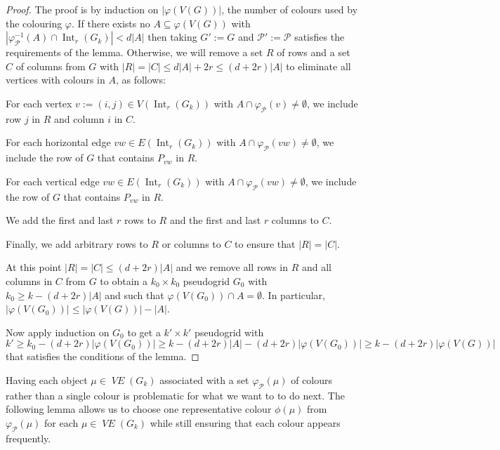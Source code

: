 \documentclass{patmorin}
\DeclareMathOperator{\interior}{Int}
\DeclareMathOperator{\VE}{\mathit{VE}}
\begin{document}
\begin{proof}
  The proof is by induction on $|\varphi(V(G))|$, the number of colours used by the colouring $\varphi$.  If there exists no $A\subseteq \varphi(V(G))$ with $|\varphi_{\mathcal{P}}^{-1}(A)\cap\interior_r(G_k)| < d|A|$ then taking $G':=G$ and $\mathcal{P}':=\mathcal{P}$ satisfies the requirements of the lemma.  Otherwise, we will remove a set $R$ of rows and a set $C$ of columns from $G$ with $|R|=|C|\le d|A|+2r \le (d+2r)|A|$ to eliminate all vertices with colours in $A$, as follows:
  \begin{compactitem}
    \item For each vertex $v:=(i,j)\in V(\interior_r(G_{k}))$ with $A\cap\varphi_\mathcal{P}(v)\neq\emptyset$, we include row $j$ in $R$ and column $i$ in $C$.
    \item For each horizontal edge $vw\in E(\interior_r(G_{k}))$ with $A\cap\varphi_\mathcal{P}(vw)\neq\emptyset$, we include the row of $G$ that contains $P_{vw}$ in $R$.
    \item For each vertical edge $vw\in E(\interior_r(G_{k}))$ with $A\cap\varphi_\mathcal{P}(vw)\neq\emptyset$, we include the row of $G$ that contains $P_{vw}$ in $R$.
    \item We add the first and last $r$ rows to $R$ and the first and last $r$ columns to $C$.
    \item Finally, we add arbitrary rows to $R$ or columns to $C$ to ensure that $|R|=|C|$.
  \end{compactitem}
  At this point $|R|=|C|\le (d+2r)|A|$ and we remove all rows in $R$ and all columns in $C$ from $G$ to obtain a $k_0\times k_0$ pseudogrid $G_0$ with $k_0\ge k-(d+2r)|A|$ and such that $\varphi(V(G_0))\cap A=\emptyset$.  In particular, $|\varphi(V(G_0))|\le |\varphi(V(G))|-|A|$.

  Now apply induction on $G_0$ to get a $k'\times k'$ pseudogrid with
  \[
    k'\ge k_0-(d+2r)|\varphi(V(G_0))|
      \ge k-(d+2r)|A|-(d+2r)|\varphi(V(G_0))|
      \ge k - (d+2r)|\varphi(V(G))|
  \]
  that satisfies the conditions of the lemma.
\end{proof}


Having each object $\mu\in\VE(G_k)$ associated with a set $\varphi_\mathcal{P}(\mu)$ of colours rather than a single colour is problematic for what we want to to do next.  The following lemma allows us to choose one representative colour $\phi(\mu)$ from $\varphi_{\mathcal{P}}(\mu)$ for each $\mu\in \VE(G_k)$ while still ensuring that each colour appears frequently.
\end{document}
